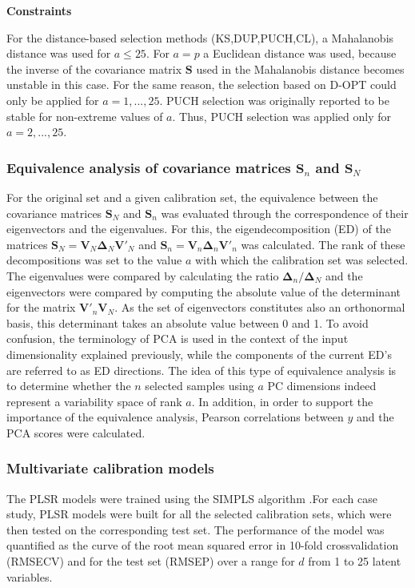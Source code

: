\documentclass[journal=ancham,manuscript=article]{achemso}
\begin{document}
\textbf{Constraints}

For the distance-based selection methods (KS,DUP,PUCH,CL), a Mahalanobis distance was used for $a\le 25$.  For $a=p$ a Euclidean distance was used, because the inverse of the covariance matrix $\mathbf{S}$ used in the Mahalanobis distance becomes unstable in this case. For the same reason, the selection based on D-OPT could only be applied for $a=1,...,25$. PUCH selection was originally reported to be stable for non-extreme values of $a$\cite{Puchwein1988}. Thus, PUCH selection was applied only for $a=2,...,25$.


\subsubsection{Equivalence analysis of covariance matrices $\mathbf{S}_n$ and $\mathbf{S}_N$}

For the original set and a given calibration set, the equivalence between the covariance matrices $\mathbf{S}_N$ and $\mathbf{S}_n$ was evaluated through the correspondence of their eigenvectors and the eigenvalues. For this, the eigendecomposition (ED) of the matrices $\mathbf{S}_N = \mathbf{V}_N \mathbf{\Delta}_N \mathbf{V}'_N$ and $\mathbf{S}_n = \mathbf{V}_n \mathbf{\Delta}_n \mathbf{V}'_n$ was calculated. The rank of these decompositions was set to the value $a$ with which the calibration set was selected. The eigenvalues were compared by calculating the ratio  $\mathbf{\Delta}_n/\mathbf{\Delta}_N$ and the eigenvectors were compared by computing the absolute value of the determinant for the matrix $\mathbf{V}'_n\mathbf{V}_N$. As the set of eigenvectors constitutes also an orthonormal basis, this determinant takes an absolute value between 0 and 1. To avoid confusion, the terminology of PCA is used in the context of the input dimensionality explained previously, while the components of the current ED's are referred to as ED directions. The idea of this type of equivalence analysis is to determine whether the $n$ selected samples using $a$ PC dimensions indeed represent a variability space of rank $a$. In addition, in order to support the importance of the equivalence analysis, Pearson correlations between $y$ and the PCA scores were calculated.

\subsubsection{Multivariate calibration models}

The PLSR models were trained using the SIMPLS algorithm \cite{DeJong1993}.For each case study, PLSR models were built for all the selected calibration sets, which were then tested on the corresponding test set. The performance of the model was quantified as the curve of the root mean squared error in 10-fold crossvalidation (RMSECV) and for the test set (RMSEP) over a range for $d$ from 1 to 25 latent variables. 
\end{document}

